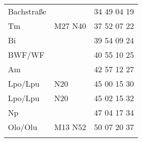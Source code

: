 \begin{tabular}{!{\color{schiefergrau}\vrule width 3pt}*{3}{l!{\color{schiefergrau}\vrule width 3pt}}}
Bachstraße   &                                                                   & 34 49 04 19 \\
Tm           & \mbus{} M27 \nbus{} N40                                           & 37 52 07 22 \\
Bi           &                                                                   & 39 54 09 24 \\
BWF/WF       &                                                                   & 40 55 10 25 \\
Am           &                                                                   & 42 57 12 27 \\
Lpo/Lpu      & \nusechs{} \nbus{} N20                                            & 45 00 15 30 \\
\hline
Lpo/Lpu      & \nusechs{} \nbus{} N20                                            & 45 02 15 32 \\
Np           &                                                                   & 47 04 17 34 \\
Olo/Olu      & \nuacht{} \mtram{} M13 \nbus{} N52                                & 50 07 20 37 \\
\myhline
\end{tabular}
